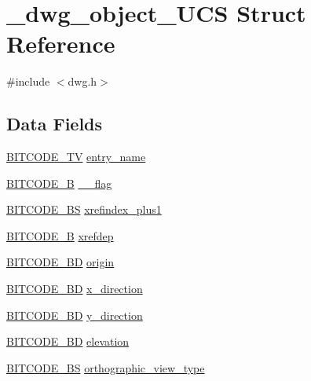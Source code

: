 \hypertarget{struct__dwg__object__UCS}{\section{\-\_\-dwg\-\_\-object\-\_\-\-U\-C\-S \-Struct \-Reference}
\label{struct__dwg__object__UCS}
}


{\ttfamily \#include $<$dwg.\-h$>$}

\subsection*{\-Data \-Fields}
\begin{DoxyCompactItemize}
\item 
\hyperlink{dwg_8h_a2a7e040c6e36ca039b03608679ecaf7c}{\-B\-I\-T\-C\-O\-D\-E\-\_\-\-T\-V} \hyperlink{struct__dwg__object__UCS_ac0fd59779dc59ff8eb71cab868182c36}{entry\-\_\-name}
\item 
\hyperlink{dwg_8h_ab533b1f62d9086749e3bb5b67e9f224e}{\-B\-I\-T\-C\-O\-D\-E\-\_\-\-B} \hyperlink{struct__dwg__object__UCS_a38f9040becb31452cfdab5d5d3d37d12}{\-\_\-\_\-flag}
\item 
\hyperlink{dwg_8h_a94297606fbd4a4ff97e8add284af0809}{\-B\-I\-T\-C\-O\-D\-E\-\_\-\-B\-S} \hyperlink{struct__dwg__object__UCS_a231c19b7fd8920cb228e07774ec287a7}{xrefindex\-\_\-plus1}
\item 
\hyperlink{dwg_8h_ab533b1f62d9086749e3bb5b67e9f224e}{\-B\-I\-T\-C\-O\-D\-E\-\_\-\-B} \hyperlink{struct__dwg__object__UCS_a8985e3f4bd8664f65dd48717145659a7}{xrefdep}
\item 
\hyperlink{dwg_8h_a00698ef1bb072aa0a9360c6fc1c57587}{\-B\-I\-T\-C\-O\-D\-E\-\_\-B\-D} \hyperlink{struct__dwg__object__UCS_acfe594b0e38d055bffc0dcfc388e3fed}{origin}
\item 
\hyperlink{dwg_8h_a00698ef1bb072aa0a9360c6fc1c57587}{\-B\-I\-T\-C\-O\-D\-E\-\_\-B\-D} \hyperlink{struct__dwg__object__UCS_ac9f5736eade22c1a212efa75c05fdc6f}{x\-\_\-direction}
\item 
\hyperlink{dwg_8h_a00698ef1bb072aa0a9360c6fc1c57587}{\-B\-I\-T\-C\-O\-D\-E\-\_\-B\-D} \hyperlink{struct__dwg__object__UCS_acbed84011f92a7e6404a237852cf51f0}{y\-\_\-direction}
\item 
\hyperlink{dwg_8h_a3c1e6781466b74ba07785d57da70ed97}{\-B\-I\-T\-C\-O\-D\-E\-\_\-\-B\-D} \hyperlink{struct__dwg__object__UCS_a07e243f5ced380454ae6e48c0947affe}{elevation}
\item 
\hyperlink{dwg_8h_a94297606fbd4a4ff97e8add284af0809}{\-B\-I\-T\-C\-O\-D\-E\-\_\-\-B\-S} \hyperlink{struct__dwg__object__UCS_ae3e76ea5ffe771c6a5e82be5db80f0fe}{orthographic\-\_\-view\-\_\-type}

\end{DoxyCompactItemize}
